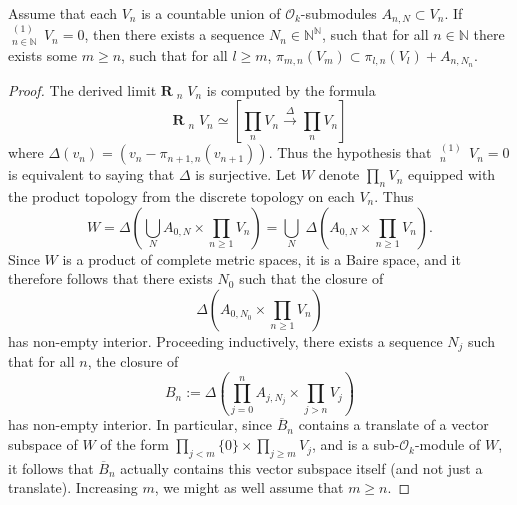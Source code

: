 \documentclass[10pt,a4paper]{amsart}
\def\N{{\mathbb N}}
\def\cO{{\mathcal O}}
\def\limpro{\mathop{\lim\limits_{\displaystyle\leftarrow}}}
\begin{document}
\begin{prop} 
Assume that each $V_n$ is a countable union of $\cO_k$-submodules $A_{n,N}\subset V_n$. If $\limpro_{n\in \N}^{(1)}\,V_n =0$, then there exists a sequence $N_n\in \N^{\N}$, such that for all $n\in \N$ there exists some $m\geq n$, such that for all $l\geq m$, $\pi_{m,n}(V_m)\subset \pi_{l,n}(V_l)+A_{n,N_n}$.
\end{prop}

\begin{proof} The derived limit $\mathbf{R}\!\limpro_{n} V_n$ is computed by the formula
\[ \mathbf{R}\!\limpro_{n} V_n \simeq \left[ \prod_n V_n \overset{\Delta}{\longrightarrow} \prod_n V_n \right] \]
where $\Delta(v_n)=(v_n-\pi_{n+1,n}(v_{n+1}))$. Thus the hypothesis that $\limpro_{n}^{(1)}\,V_n=0$ is equivalent to saying that $\Delta$ is surjective. Let $W$ denote $\prod_n V_n$ equipped with the product topology from the discrete topology on each $V_n$. Thus
\[ W = \Delta\left (\bigcup_N A_{0,N} \times \prod_{n\geq 1} V_n \right)=\bigcup_N \;\Delta\left(A_{0,N}\times \prod_{n\geq 1} V_n \right).\]
Since $W$ is a product of complete metric spaces, it is a Baire space, and it therefore follows that there exists $N_0$ such that the closure of 
\[ \Delta\left(A_{0,N_0}\times \prod_{n\geq 1} V_n\right) \]
has non-empty interior. Proceeding inductively, there exists a sequence $N_j$ such that for all $n$, the closure of 
\[ B_n:=\Delta\left(\prod_{j=0}^n A_{j,N_j}\times \prod_{j> n} V_j\right) \]
has non-empty interior. In particular, since $\overline{B}_n$ contains a translate of a vector subspace of $W$ of the form $\prod_{j<m} \{0\}\times \prod_{j\geq m} V_j$, and is a sub-$\cO_k$-module of $W$, it follows that $\overline{B}_n$ actually contains this vector subspace itself (and not just a translate). Increasing $m$, we might as well assume that $m\geq n$.


\end{proof}
\end{document}
